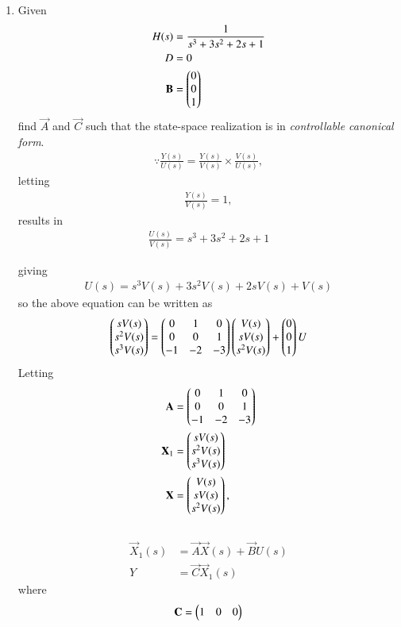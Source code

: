 \begin{enumerate}[label=\thesection.\arabic*.,ref=\thesection.\theenumi]
\item Given 
\begin{align}
\label{eq:ee18btech11004_system}
H(s)&=\frac{1}{s^3+3s^2+2s+1}
\\
D&=0
\\
\mathbf{B}&= \begin{pmatrix}0\\0\\1\end{pmatrix}
\end{align}
%
 find $\vec{A}$ and $\vec{C}$ such that the state-space realization is in {\em controllable canonical form}.
\\
\solution 
\begin{align} 
\because {\frac{Y(s)}{U(s)}}= \frac{Y(s)}{V(s)} \times \frac{V(s)}{U(s)},
\end{align}
letting
\begin{align}
 {\frac{Y(s)}{V(s)}}= 1, 
\end{align}
results in 
\begin{align}
{\frac{U(s)}{V(s)}}={s^3 + 3s^2+2s + 1}
\end{align}

giving
\begin{align}
U(s)= s^3 V(s) + 3s^2 V(s)+2sV(s) + V(s)
\end{align}
%
so the above equation  can be written as
\begin{align}
\begin{pmatrix}sV(s)\\s^2V(s)\\s^3V(s)\end{pmatrix}
=
\begin{pmatrix}0&1&0\\0&0&1\\-1&-2&-3\end{pmatrix}\begin{pmatrix}V(s)\\sV(s)\\s^2V(s)\end{pmatrix}
+
\begin{pmatrix}0\\0\\1\end{pmatrix}  U
\end{align}
Letting
\begin{align}
\mathbf{A}&=\begin{pmatrix}0&1&0\\0&0&1\\-1&-2&-3\end{pmatrix}
\\
\mathbf{X}_1 &= \begin{pmatrix}sV(s)\\s^2V(s)\\s^3V(s)\end{pmatrix}
\\
\mathbf{X} &= \begin{pmatrix}V(s)\\sV(s)\\s^2V(s)\end{pmatrix},
\end{align}
\\
\begin{align}
\vec{X}_{1}(s) &= \vec{A}\vec{X}(s)+ \vec{B}U(s)
\\
Y&=\vec{C}\vec{X}_{1}(s)
\end{align}
where
\begin{align}
\mathbf{C}=\begin{pmatrix}1&0&0\end{pmatrix}
\end{align}


\end{enumerate}

